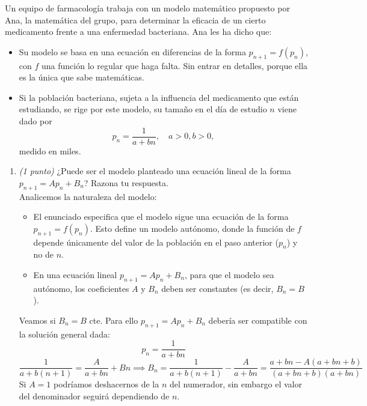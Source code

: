 \documentclass[12pt]{article}
\begin{document}
    \begin{ejercicio}
        Un equipo de farmacología trabaja con un modelo matemático propuesto por Ana, la matemática del grupo, para determinar la eficacia de un cierto medicamento frente a una enfermedad bacteriana. Ana les ha dicho que:
        
        \begin{itemize}
        \item Su modelo se basa en una ecuación en diferencias de la forma $p_{n+1} = f(p_n)$, con $f$ una función lo regular que haga falta. Sin entrar en detalles, porque ella es la única que sabe matemáticas.
        
        \item Si la población bacteriana, sujeta a la influencia del medicamento que están estudiando, se rige por este modelo, su tamaño en el día de estudio $n$ viene dado por
            $$ p_n = \frac{1}{a + bn}, \quad a > 0, b > 0, $$
        medido en miles.
        \end{itemize}
        
        \begin{enumerate}
            \item \emph{(1 punto)} ¿Puede ser el modelo planteado una ecuación lineal de la forma $p_{n+1} = Ap_n + B_n$? Razona tu respuesta. \\
            
            Analicemos la naturaleza del modelo:
                \begin{itemize}
                    \item El enunciado especifica que el modelo sigue una ecuación de la forma $p_{n+1} = f(p_n)$. Esto define un modelo autónomo, donde la función de $f$ depende únicamente del valor de la población en el paso anterior ($p_n$) y no de $n$.
                    \item En una ecuación lineal $p_{n+1} = Ap_n + B_n$, para que el modelo sea autónomo, los coeficientes $A$ y $B_n$ deben ser constantes (es decir, $B_n = B$).
                \end{itemize}
                
                Veamos si $B_n = B$ cte. Para ello $p_{n+1} = Ap_n + B_n$ debería ser compatible con la solución general dada:
                $$ p_n = \frac{1}{a + bn} $$
                $$\frac{1}{a + b(n+1)} = \frac{A}{a + bn} + Bn \implies B_n = \frac{1}{a + b(n+1)} - \frac{A}{a + bn} = \frac{a + bn - A(a + bn + b)}{(a + bn + b)(a + bn)}$$
                Si $A=1$ podríamos deshacernos de la $n$ del numerador, sin embargo el valor del denominador seguirá dependiendo de $n$.
                

\end{enumerate}
\end{ejercicio}
\end{document}

